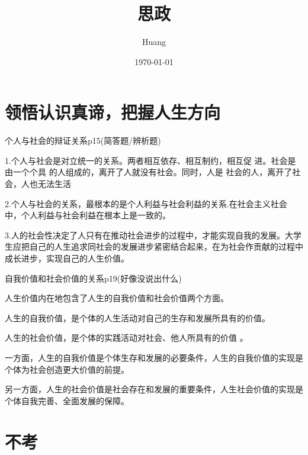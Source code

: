 \documentclass[lang=cn,10pt]{elegantbook}
\title{思政}
\author{ Huang}
\date{\today}
\begin{document}
	
	\maketitle
	\frontmatter
	
	\tableofcontents
	
	\mainmatter
	\chapter{领悟认识真谛，把握人生方向}
	\begin{example}
		个人与社会的辩证关系p15(简答题/辨析题)
	\end{example}
	\begin{solution}
		
		1.个人与社会是对立统一的关系。两者相互依存、相互制约，相互促
		进。社会是由一个个具 的人组成的，离开了人就没有社会。同时，人是
		社会的人，离开了社会，人也无法生活
		
		2.个人与社会的关系，最根本的是个人利益与社会利益的关系.在社会主义社会中，个人利益与社会利益在根本上是一致的。
		
		3.人的社会性决定了人只有在推动社会进步的过程中，才能实现自我的发展。大学生应把自己的人生追求同社会的发展进步紧密结合起来，在为社会作贡献的过程中成长进步，实现自己的人生价值。
	\end{solution}
	\begin{example}
		自我价值和社会价值的关系p19(好像没说出什么)
	\end{example}
	\begin{solution}
		
		人生价值内在地包含了人生的自我价值和社会价值两个方面。
		
		人生的自我价值，是个体的人生活动对自己的生存和发展所具有的价值。
		
		 人生的社会价值，是个体的实践活动对社会、他人所具有的价值 。
		 
		 一方面，人生的自我价值是个体生存和发展的必要条件，人生的自我价值的实现是个体为社会创造更大价值的前提。 
		 
		 另一方面，人生的社会价值是社会存在和发展的重要条件，人生社会价值的实现是个体自我完善、全面发展的保障。
	\end{solution}
	\chapter{不考}
\end{document}
